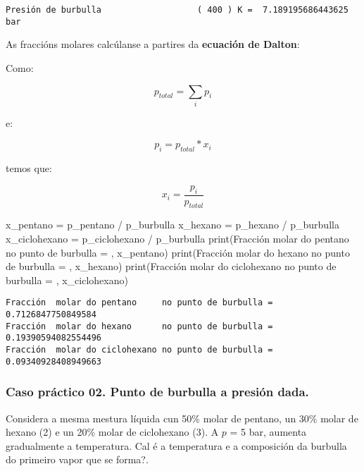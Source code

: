\documentclass[
  letterpaper,
  DIV=11,
  numbers=noendperiod]{scrartcl}
\newenvironment{Shaded}{\begin{snugshade}}{\end{snugshade}}
\newcommand{\BuiltInTok}[1]{\textcolor[rgb]{0.00,0.23,0.31}{#1}}
\newcommand{\NormalTok}[1]{\textcolor[rgb]{0.00,0.23,0.31}{#1}}
\newcommand{\OperatorTok}[1]{\textcolor[rgb]{0.37,0.37,0.37}{#1}}
\newcommand{\StringTok}[1]{\textcolor[rgb]{0.13,0.47,0.30}{#1}}
\begin{document}
\begin{verbatim}
Presión de burbulla                   ( 400 ) K =  7.189195686443625 bar
\end{verbatim}

As fraccións molares calcúlanse a partires da \textbf{ecuación de
Dalton}:

Como:

\[
p_{total} = \sum_i p_i
\]

e:

\[
p_i = p_{total}*x_i
\]

temos que:

\[
x_i = \frac{p_i}{p_{total}}
\]

\begin{Shaded}
\begin{Highlighting}[]
\NormalTok{x\_pentano     }\OperatorTok{=}\NormalTok{ p\_pentano }\OperatorTok{/}\NormalTok{ p\_burbulla}
\NormalTok{x\_hexano      }\OperatorTok{=}\NormalTok{ p\_hexano }\OperatorTok{/}\NormalTok{ p\_burbulla}
\NormalTok{x\_ciclohexano }\OperatorTok{=}\NormalTok{ p\_ciclohexano }\OperatorTok{/}\NormalTok{ p\_burbulla}
\BuiltInTok{print}\NormalTok{(}\StringTok{\textquotesingle{}Fracción  molar do pentano     no punto de burbulla = \textquotesingle{}}\NormalTok{, x\_pentano)}
\BuiltInTok{print}\NormalTok{(}\StringTok{\textquotesingle{}Fracción  molar do hexano      no punto de burbulla = \textquotesingle{}}\NormalTok{, x\_hexano)}
\BuiltInTok{print}\NormalTok{(}\StringTok{\textquotesingle{}Fracción  molar do ciclohexano no punto de burbulla = \textquotesingle{}}\NormalTok{, x\_ciclohexano)}
\end{Highlighting}
\end{Shaded}

\begin{verbatim}
Fracción  molar do pentano     no punto de burbulla =  0.7126847750849584
Fracción  molar do hexano      no punto de burbulla =  0.19390594082554496
Fracción  molar do ciclohexano no punto de burbulla =  0.09340928408949663
\end{verbatim}

\subsubsection{Caso práctico 02. Punto de burbulla a presión
dada.}\label{caso-pruxe1ctico-02.-punto-de-burbulla-a-presiuxf3n-dada.}

Considera a mesma mestura líquida cun 50\% molar de pentano, un 30\%
molar de hexano (2) e un 20\% molar de ciclohexano (3). A \(p\) = 5 bar,
aumenta gradualmente a temperatura. Cal é a temperatura e a composición
da burbulla do primeiro vapor que se forma?.
\end{document}

